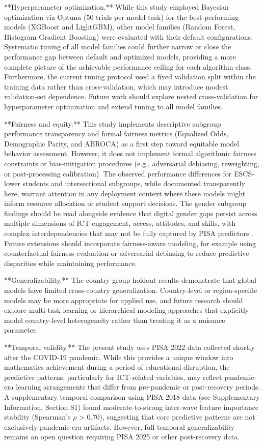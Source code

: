 \documentclass[pdflatex,sn-mathphys-ay]{sn-jnl}
\begin{document}
**Hyperparameter optimization.** While this study employed Bayesian optimization via Optuna (50 trials per model-task) for the best-performing models (XGBoost and LightGBM), other model families (Random Forest, Histogram Gradient Boosting) were evaluated with their default configurations. Systematic tuning of all model families could further narrow or close the performance gap between default and optimized models, providing a more complete picture of the achievable performance ceiling for each algorithm class. Furthermore, the current tuning protocol used a fixed validation split within the training data rather than cross-validation, which may introduce modest validation-set dependence. Future work should explore nested cross-validation for hyperparameter optimization and extend tuning to all model families.

**Fairness and equity.** This study implements descriptive subgroup performance transparency and formal fairness metrics (Equalized Odds, Demographic Parity, and ABROCA) as a first step toward equitable model behavior assessment. However, it does not implement formal algorithmic fairness constraints or bias-mitigation procedures (e.g., adversarial debiasing, reweighting, or post-processing calibration). The observed performance differences for ESCS-lower students and intersectional subgroups, while documented transparently here, warrant attention in any deployment context where these models might inform resource allocation or student support decisions. The gender subgroup findings should be read alongside evidence that digital gender gaps persist across multiple dimensions of ICT engagement, access, attitudes, and skills, with complex interdependencies that may not be fully captured by PISA predictors \citep{Campos_Scherer_2024}. Future extensions should incorporate fairness-aware modeling, for example using counterfactual fairness evaluation or adversarial debiasing to reduce predictive disparities while maintaining performance.

**Generalizability.** The country-group holdout results demonstrate that global models have limited cross-country generalization. Country-level or region-specific models may be more appropriate for applied use, and future research should explore multi-task learning or hierarchical modeling approaches that explicitly model country-level heterogeneity rather than treating it as a nuisance parameter.

**Temporal validity.** The present study uses PISA 2022 data collected shortly after the COVID-19 pandemic. While this provides a unique window into mathematics achievement during a period of educational disruption, the predictive patterns, particularly for ICT-related variables, may reflect pandemic-era learning arrangements that differ from pre-pandemic or post-recovery periods. A supplementary temporal comparison using PISA 2018 data (see Supplementary Information, Section S1) found moderate-to-strong inter-wave feature importance stability (Spearman's $\rho$ > 0.70), suggesting that core predictive patterns are not exclusively pandemic-era artifacts. However, full temporal generalizability remains an open question requiring PISA 2025 or other post-recovery data.
\end{document}
